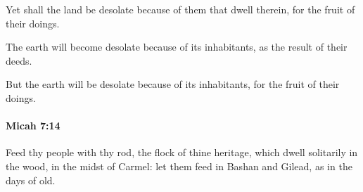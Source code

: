 			\begin{versebox}
					\item[BHS] 
					\item[LXX] 
					\item[ASV] Yet shall the land be desolate because of them that dwell therein, for the fruit of their doings.
					\item[NIV] The earth will become desolate because of its inhabitants, as the result of their deeds.
					\item[NRSV] But the earth will be desolate because of its inhabitants, for the fruit of their doings.
			\end{versebox}

		\paragraph{Micah 7:14} %
			\label{MICAH-7-14}

			Feed thy people with thy rod, the flock of thine heritage, which dwell solitarily in the wood, in the midst of Carmel: let them feed in Bashan and Gilead, as in the days of old.


